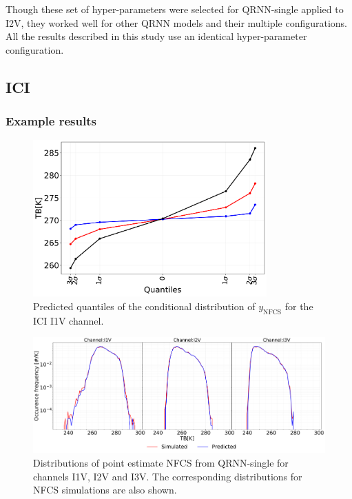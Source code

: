 \documentclass[amt, manuscript]{copernicus}
\newcommand{\ynfcs}{y_\text{NFCS}}
\begin{document}
Though these set of hyper-parameters were selected for QRNN-single applied to I2V, they worked well for other QRNN models and their multiple configurations. All the results described in this study use an identical hyper-parameter configuration.


\subsection{ICI}
\subsubsection{Example results}
%
\begin{figure}[t]
	\centering
	\includegraphics[height=60mm]{Figures/posterior_distribution_I1V.pdf} 
	\caption{Predicted quantiles of the conditional distribution of $\ynfcs$ for
		the ICI I1V channel.}
	\label{fig:posterior_distribution_I1V}	
\end{figure}
\begin{figure}[t]
	\includegraphics[width=\textwidth]{Figures/PDF_predictions_ICI.pdf} 
	\caption{Distributions of point estimate NFCS from QRNN-single for channels I1V, I2V and I3V. The corresponding distributions for NFCS simulations are also shown.}
	\label{fig:PDF_predictions}	
\end{figure}
\end{document}
